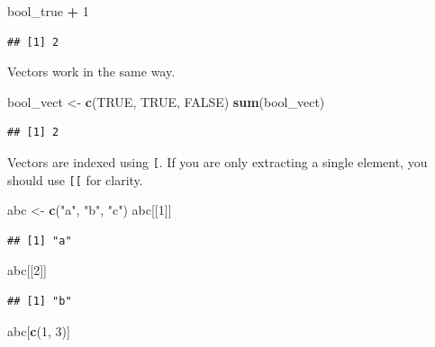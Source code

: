 \documentclass[openany]{book}
\newenvironment{Shaded}{\begin{snugshade}}{\end{snugshade}}
\newcommand{\DecValTok}[1]{\textcolor[rgb]{0.00,0.00,0.81}{#1}}
\newcommand{\KeywordTok}[1]{\textcolor[rgb]{0.13,0.29,0.53}{\textbf{#1}}}
\newcommand{\NormalTok}[1]{#1}
\newcommand{\OperatorTok}[1]{\textcolor[rgb]{0.81,0.36,0.00}{\textbf{#1}}}
\newcommand{\OtherTok}[1]{\textcolor[rgb]{0.56,0.35,0.01}{#1}}
\newcommand{\StringTok}[1]{\textcolor[rgb]{0.31,0.60,0.02}{#1}}
\begin{document}
\begin{Shaded}
\begin{Highlighting}[]
\NormalTok{bool_true }\OperatorTok{+}\StringTok{ }\DecValTok{1}
\end{Highlighting}
\end{Shaded}

\begin{verbatim}
## [1] 2
\end{verbatim}

Vectors work in the same way.

\begin{Shaded}
\begin{Highlighting}[]
\NormalTok{bool_vect <-}\StringTok{ }\KeywordTok{c}\NormalTok{(}\OtherTok{TRUE}\NormalTok{, }\OtherTok{TRUE}\NormalTok{, }\OtherTok{FALSE}\NormalTok{)}
\KeywordTok{sum}\NormalTok{(bool_vect)}
\end{Highlighting}
\end{Shaded}

\begin{verbatim}
## [1] 2
\end{verbatim}

Vectors are indexed using \texttt{{[}}. If you are only extracting a single element, you
should use \texttt{{[}{[}} for clarity.

\begin{Shaded}
\begin{Highlighting}[]
\NormalTok{abc <-}\StringTok{ }\KeywordTok{c}\NormalTok{(}\StringTok{"a"}\NormalTok{, }\StringTok{"b"}\NormalTok{, }\StringTok{"c"}\NormalTok{)}
\NormalTok{abc[[}\DecValTok{1}\NormalTok{]]}
\end{Highlighting}
\end{Shaded}

\begin{verbatim}
## [1] "a"
\end{verbatim}

\begin{Shaded}
\begin{Highlighting}[]
\NormalTok{abc[[}\DecValTok{2}\NormalTok{]]}
\end{Highlighting}
\end{Shaded}

\begin{verbatim}
## [1] "b"
\end{verbatim}

\begin{Shaded}
\begin{Highlighting}[]
\NormalTok{abc[}\KeywordTok{c}\NormalTok{(}\DecValTok{1}\NormalTok{, }\DecValTok{3}\NormalTok{)]}
\end{Highlighting}
\end{Shaded}
\end{document}
